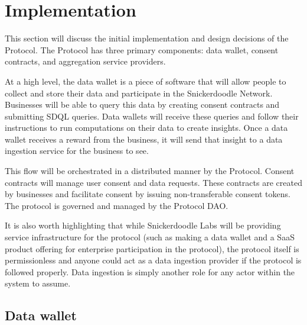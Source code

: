 \section{Implementation}
\label{section:Implementation}



This section will discuss the initial implementation and design decisions of the Protocol. The Protocol has three primary 
components: data wallet, consent contracts, and aggregation service providers.

At a high level, the data wallet is a piece of software that will allow people to collect and store their data and participate 
in the Snickerdoodle Network. Businesses will be able to query this data by creating consent contracts and submitting SDQL queries. 
Data wallets will receive these queries and follow their instructions to run computations on their data to create insights. Once a 
data wallet receives a reward from the business, it will send that insight to a data ingestion service for the business to see. 

This flow will be orchestrated in a distributed manner by the Protocol. Consent contracts will manage user consent 
and data requests. These contracts are created by businesses and facilitate consent by issuing non-transferable consent tokens. 
The protocol is governed and managed by the Protocol DAO. 

It is also worth highlighting that while Snickerdoodle Labs will be providing service infrastructure for the protocol (such as 
making a data wallet and a SaaS product offering for enterprise participation in the protocol), the protocol itself is 
permissionless and anyone could act as a data ingestion provider if the protocol is followed properly. Data ingestion is 
simply another role for any actor within the system to assume.

\subsection{Data wallet}
\label{section:DataWallet}
%



